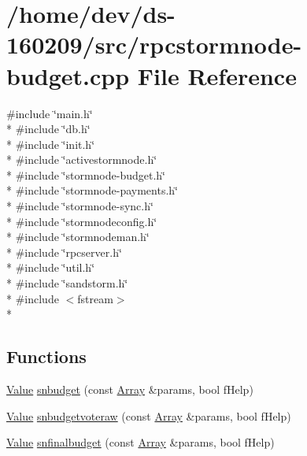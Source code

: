 \hypertarget{rpcstormnode-budget_8cpp}{}\section{/home/dev/ds-\/160209/src/rpcstormnode-\/budget.cpp File Reference}
\label{rpcstormnode-budget_8cpp}
{\ttfamily \#include \char`\"{}main.\+h\char`\"{}}\\*
{\ttfamily \#include \char`\"{}db.\+h\char`\"{}}\\*
{\ttfamily \#include \char`\"{}init.\+h\char`\"{}}\\*
{\ttfamily \#include \char`\"{}activestormnode.\+h\char`\"{}}\\*
{\ttfamily \#include \char`\"{}stormnode-\/budget.\+h\char`\"{}}\\*
{\ttfamily \#include \char`\"{}stormnode-\/payments.\+h\char`\"{}}\\*
{\ttfamily \#include \char`\"{}stormnode-\/sync.\+h\char`\"{}}\\*
{\ttfamily \#include \char`\"{}stormnodeconfig.\+h\char`\"{}}\\*
{\ttfamily \#include \char`\"{}stormnodeman.\+h\char`\"{}}\\*
{\ttfamily \#include \char`\"{}rpcserver.\+h\char`\"{}}\\*
{\ttfamily \#include \char`\"{}util.\+h\char`\"{}}\\*
{\ttfamily \#include \char`\"{}sandstorm.\+h\char`\"{}}\\*
{\ttfamily \#include $<$fstream$>$}\\*
\subsection*{Functions}
\begin{DoxyCompactItemize}
\item 
\hyperlink{namespacejson__spirit_a28e6abc99fda7b06c430ca38802527a3}{Value} \hyperlink{rpcstormnode-budget_8cpp_aae19bf2ba52f3b864bfaf70206bcb29a}{snbudget} (const \hyperlink{namespacejson__spirit_aee299e52bda3816039a53210cbbfea1a}{Array} \&params, bool f\+Help)
\item 
\hyperlink{namespacejson__spirit_a28e6abc99fda7b06c430ca38802527a3}{Value} \hyperlink{rpcstormnode-budget_8cpp_a0ed276908ef20f9b0ed87c3ed4c26d25}{snbudgetvoteraw} (const \hyperlink{namespacejson__spirit_aee299e52bda3816039a53210cbbfea1a}{Array} \&params, bool f\+Help)
\item 
\hyperlink{namespacejson__spirit_a28e6abc99fda7b06c430ca38802527a3}{Value} \hyperlink{rpcstormnode-budget_8cpp_aaff1bdc7f9f32708efc9094bb6ab0e0d}{snfinalbudget} (const \hyperlink{namespacejson__spirit_aee299e52bda3816039a53210cbbfea1a}{Array} \&params, bool f\+Help)
\end{DoxyCompactItemize}


